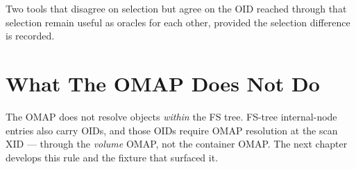 Two tools that disagree on selection but agree on the OID reached
through that selection remain useful as oracles for each other,
provided the selection difference is recorded.

\section{What The OMAP Does Not Do}

The OMAP does not resolve objects \emph{within} the FS tree.
FS-tree internal-node entries also carry OIDs, and those OIDs
require OMAP resolution at the scan XID --- through the
\emph{volume} OMAP, not the container OMAP. The next chapter
develops this rule and the fixture that surfaced it.
